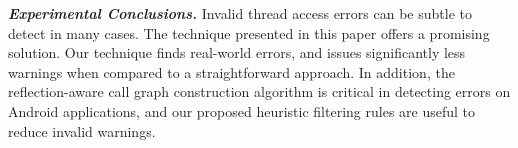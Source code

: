 


\vspace{1mm}

\noindent \textbf{\textit{Experimental Conclusions.}}
Invalid thread access errors  can be subtle to detect in many cases.
The technique presented in this paper offers a promising solution.
Our technique finds real-world errors, and issues
significantly less warnings when compared to a straightforward
approach. In addition, the reflection-aware call graph construction algorithm
is critical in detecting errors on Android applications, and our
proposed heuristic filtering rules are useful to reduce invalid warnings.





